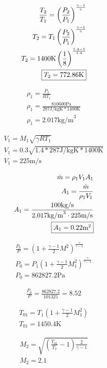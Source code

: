 
\begin{align*}
    \frac{T_2}{T_1}=\left(\frac{P_2}{P_1}\right)^\frac{\gamma-1}{\gamma} \\
    T_2=T_1\left(\frac{P_2}{P_1}\right)^\frac{\gamma-1}{\gamma} \\
    T_2=1400\text{K}\left(\frac{1}{8}\right)^\frac{1.4-1}{1.4} \\
    \fbox{$T_2=772.86$K}
\end{align*}


\begin{align*}
    \rho_1=\frac{P_1}{RT_1} \\
    \rho_1=\frac{810600\text{Pa}}{287\text{J/kgK}*1400\text{K}} \\
    \rho_1=2.017\text{kg/m}^3
\end{align*}

\begin{align*}
    V_1=M_1\sqrt{\gamma RT_1} \\
    V_1=0.3\sqrt{1.4*287\text{J/kgK}*1400\text{K}} \\
    V_1=225\text{m/s}
\end{align*}

\begin{align*}
    \dot{m}=\rho_1 V_1 A_1 \\
    A_1=\frac{\dot{m}}{\rho_1V_1} \\
    A_1=\frac{100\text{kg/s}}{2.017\text{kg/m}^3\cdot 225\text{m/s}} \\
    \fbox{$A_1=0.22$m$^2$}
\end{align*}


\begin{align*}
    \frac{P_0}{P}=\left(1+\frac{\gamma-1}{2}M^2\right)^\frac{\gamma}{\gamma-1} \\
    P_0=P_1\left(1+\frac{\gamma-1}{2}M_1^2\right)^\frac{\gamma}{\gamma-1} \\
    P_0=862827.2\text{Pa}
\end{align*}

\begin{align*}
    \frac{P_0}{P}=\frac{862827.2}{101325}=8.52
\end{align*}


\begin{align*}
    T_{01}=T_1\left(1+\frac{\gamma-1}{2}M_1^2\right) \\
    T_{01}=1450.4\text{K}
\end{align*}

\begin{align*}
    M_2=\sqrt{\left(\frac{T_{01}}{T_2}-1\right)\frac{2}{\gamma-1}} \\
    M_2=2.1
\end{align*}

